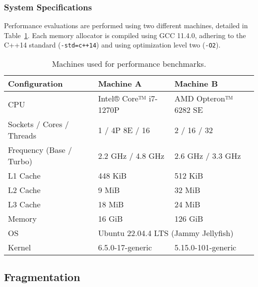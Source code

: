 \subsubsection{System Specifications}
Performance evaluations are performed using two different machines, detailed in Table~\ref{table:performancespecs}. Each memory allocator is compiled using GCC 11.4.0, adhering to the C++14 standard (\texttt{-std=c++14}) and using optimization level two (\texttt{-O2}).

\begin{table}[h]
    \begin{tabular}{lll}
        \textbf{Configuration}    & \textbf{Machine A}                                       & \textbf{Machine B}   \\ \hline
        CPU                       & Intel® Core™ i7-1270P                                    & AMD Opteron™ 6282 SE \\ \hline
        Sockets / Cores / Threads & 1 / 4P 8E / 16                                           & 2 / 16 / 32          \\ \hline
        Frequency (Base / Turbo)  & 2.2 GHz / 4.8 GHz                                        & 2.6 GHz / 3.3 GHz    \\ \hline
        L1 Cache                  & 448 KiB                                                  & 512 KiB              \\ \hline
        L2 Cache                  & 9 MiB                                                    & 32 MiB               \\ \hline
        L3 Cache                  & 18 MiB                                                   & 24 MiB               \\ \hline
        Memory                    & 16 GiB                                                   & 126 GiB              \\ \hline
        OS                        & \multicolumn{2}{l}{Ubuntu 22.04.4 LTS (Jammy Jellyfish)}                        \\ \hline
        Kernel                    & 6.5.0-17-generic                                         & 5.15.0-101-generic   \\
    \end{tabular}
    \centering
    \caption{Machines used for performance benchmarks.}
    \label{table:performancespecs}
\end{table}

\subsection{Fragmentation} \label{sec:frageval}
